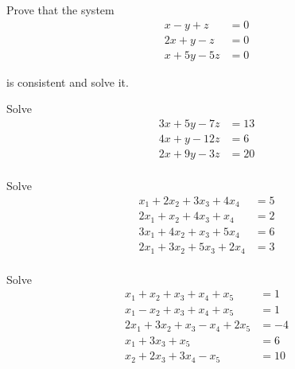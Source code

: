 \documentclass[11pt]{amsbook}
\begin{document}
    
    \begin{hEnumerateArabic}
        \setcounter{enumi}{46}
        \item Prove that the system
            \begin{align*}
                x - y + z &= 0\\
                2x + y - z &= 0\\
                x + 5y - 5z &= 0
            \end{align*}
        
        \noindent is consistent and solve it.\\
     
        \item Solve
            \begin{align*}
                3x + 5y - 7z &= 13\\
                4x + y - 12z &= 6\\
                2x + 9y - 3z &= 20\\
            \end{align*}
        
        \item Solve
            \begin{align*}
                x_{1} + 2x_{2} + 3x_{3}+ 4x_{4} &= 5\\
                2x_{1} + x_{2} + 4x_{3}+ x_{4} &= 2\\
                3x_{1} + 4x_{2} + x_{3}+ 5x_{4} &= 6\\
                2x_{1} + 3x_{2} + 5x_{3}+ 2x_{4} &= 3\\
            \end{align*}
        
        \item Solve
            \begin{align*}
                x_{1} + x_{2} + x_{3}+ x_{4}+ x_{5} &= 1\\
                x_{1} - x_{2} + x_{3}+ x_{4}+ x_{5} &= 1\\
                2x_{1} + 3x_{2} + x_{3}- x_{4}+ 2x_{5} &= -4\\
                x_{1} + 3x_{3}+ x_{5} &= 6\\
                x_{2} + 2x_{3}+ 3x_{4}- x_{5} &= 10\\
            \end{align*}
    
    \end{hEnumerateArabic}
    
\end{document}
